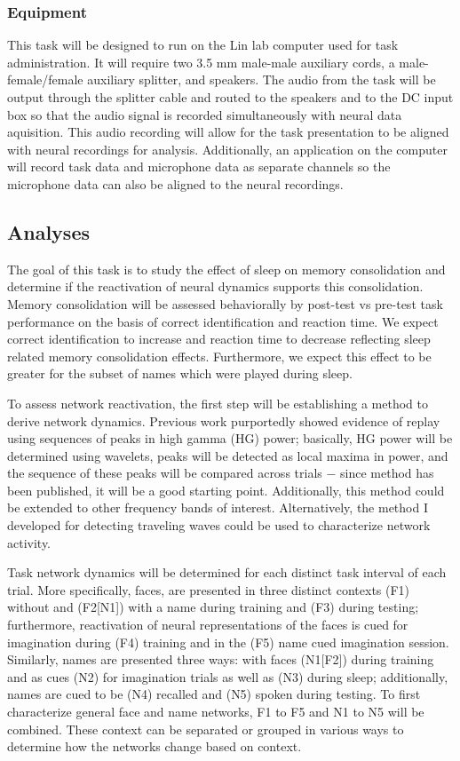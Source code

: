 \subsubsection*{Equipment}
This task will be designed to run on the Lin lab computer used for task administration. It will require two 3.5 mm male-male auxiliary cords, a male-female/female auxiliary splitter, and speakers. The audio from the task will be output through the splitter cable and routed to the speakers and to the DC input box so that the audio signal is recorded simultaneously with neural data aquisition. This audio recording will allow for the task presentation to be aligned with neural recordings for analysis. Additionally, an application on the computer will record task data and microphone data as separate channels so the microphone data can also be aligned to the neural recordings.

\subsection*{Analyses}
The goal of this task is to study the effect of sleep on memory consolidation and determine if the reactivation of neural dynamics supports this consolidation. Memory consolidation will be assessed behaviorally by post-test vs pre-test task performance on the basis of correct identification and reaction time. We expect correct identification to increase and reaction time to decrease reflecting sleep related memory consolidation effects. Furthermore, we expect this effect to be greater for the subset of names which were played during sleep.

To assess network reactivation, the first step will be establishing a method to derive network dynamics. Previous work purportedly showed evidence of replay using sequences of peaks in high gamma (HG) power; basically, HG power will be determined using wavelets, peaks will be detected as local maxima in power, and the sequence of these peaks will be compared across trials $-$ since method has been published, it will be a good starting point. Additionally, this method could be extended to other frequency bands of interest. Alternatively, the method I developed for detecting traveling waves could be used to characterize network activity.

Task network dynamics will be determined for each distinct task interval of each trial. More specifically, faces, are presented in three distinct contexts (F1) without and (F2[N1]) with a name during training and (F3) during testing; furthermore, reactivation of neural representations of the faces is cued for imagination during (F4) training and in the (F5) name cued imagination session. Similarly, names are presented three ways: with faces (N1[F2]) during training and as cues (N2) for imagination trials as well as (N3) during sleep; additionally, names are cued to be (N4) recalled and (N5) spoken during testing. To first characterize general face and name networks, F1 to F5 and N1 to N5 will be combined. These context can be separated or grouped in various ways to determine how the networks change based on context.

